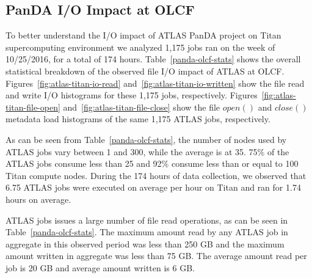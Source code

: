 


\subsection{PanDA I/O Impact at OLCF}

To better understand the I/O impact of ATLAS PanDA project on Titan
supercomputing environment we analyzed 1,175 jobs ran on the week of 10/25/2016,
for a total of 174 hours. Table~\ref{panda-olcf-stats} shows the overall
statistical breakdown of the observed file I/O impact of ATLAS at OLCF\@.
Figures~\ref{fig:atlas-titan-io-read} and~\ref{fig:atlas-titan-io-written} show
the file read and write I/O histograms for these 1,175 jobs, respectively.
Figures~\ref{fig:atlas-titan-file-open} and~\ref{fig:atlas-titan-file-close}
show the file $open()$ and $close()$ metadata load histograms of the same 1,175
ATLAS jobs, respectively.

As can be seen from Table~\ref{panda-olcf-stats}, the number of nodes used by
ATLAS jobs vary between 1 and 300, while the average is at 35. 75\% of the ATLAS
jobs consume less than 25 and 92\% consume less than or equal to 100 Titan
compute nodes. During the 174 hours of data collection, we observed that 6.75
ATLAS jobs were executed on average per hour on Titan and ran for 1.74 hours on
average.

ATLAS jobs issues a large number of file read operations, as can be seen in
Table~\ref{panda-olcf-stats}. The maximum amount read by any ATLAS job in
aggregate in this observed period was less than 250 GB and the maximum amount
written in aggregate was less than 75 GB\@. The average amount read per job is
20 GB and average amount written is 6 GB\@.

